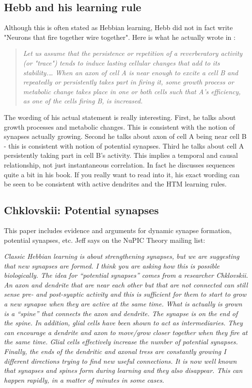 \documentclass{article} %
\begin{document}
\subsection{Hebb and his learning rule}

Although this is often stated as Hebbian learning, Hebb did not in fact write
"Neurons that fire together wire together". Here is what he actually wrote in
\cite{Hebb1949}:

\begin{quote}
\emph{Let us assume that the persistence or repetition of a reverberatory
activity (or "trace") tends to induce lasting cellular changes that add to its
stability.… When an axon of cell A is near enough to excite a cell B and
repeatedly or persistently takes part in firing it, some growth process or
metabolic change takes place in one or both cells such that A's efficiency, as
one of the cells firing B, is increased.}
\end{quote}

The wording of his actual statement is really interesting. First, he
talks about growth processes and metabolic changes. This is consistent with the
notion of synapses actually growing.  Second he talks about axon of cell A being
near cell B - this is consistent with notion of potential synapses.  Third he
talks about cell A persistently taking part in cell B’s activity. This implies a
temporal and causal relationship, not just instantaneous correlation. In fact
he discusses sequences quite a bit in his book. If  you  really  want to read
into it, his exact wording can be seen to be consistent with active dendrites
and the HTM learning rules.

\subsection{Chklovskii: Potential synapses}

This paper \cite{Chklovskii2004} includes evidence and arguments for dynamic
synapse formation,  potential synapses, etc. Jeff says on the NuPIC Theory
mailing list:

\emph{Classic Hebbian learning is about strengthening synapses, but we are
suggesting that new synapses are formed. I think you are asking how this is
possible biologically. The idea for “potential synapses” comes from a researcher
Chklovskii.  An axon and dendrite that are near each other but that are not
connected can still sense pre- and post-syaptic activity and this is sufficient
for them to start to grow a new synapse when they are active at the same time.
What is actually is grown is a “spine” that connects the axon and dendrite.  The
synapse is on the end of the spine.  In addition, glial cells have been shown to
act as intermediaries.  They can encourage a dendrite and axon to move/grow
closer together when they fire at the same time.  Glial cells effectively
increase the number of potential synapses.  Finally, the ends of the dendritic
and axonal tress are constantly growing I different directions trying to find
new useful connections.  It is now well known that synapses and spines form
during learning and they also disappear.  This can happen rapidly, in a matter
of minutes in some cases.}
\end{document}
